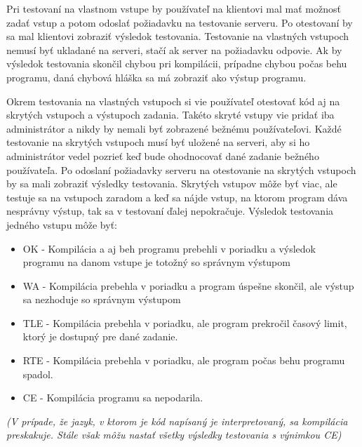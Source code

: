 Pri testovaní na vlastnom vstupe by používateľ na klientovi mal mať možnosť zadať vstup a potom
odoslať požiadavku na testovanie serveru. Po otestovaní by sa mal klientovi zobraziť výsledok
testovania. Testovanie na vlastných vstupoch nemusí byť ukladané na serveri, stačí ak server na
požiadavku odpovie. Ak by výsledok testovania skončil chybou pri kompilácii, prípadne chybou počas
behu programu, daná chybová hláška sa má zobraziť ako výstup programu.

Okrem testovania na vlastných vstupoch si vie používateľ otestovať kód aj na skrytých vstupoch a
výstupoch zadania. Takéto skryté vstupy vie pridať iba administrátor a nikdy by nemali byť zobrazené
bežnému používateľovi. Každé testovanie na skrytých vstupoch musí byť uložené na serveri, aby si ho
administrátor vedel pozrieť keď bude ohodnocovať dané zadanie bežného používateľa. Po odoslaní
požiadavky serveru na otestovanie na skrytých vstupoch by sa mali zobraziť výsledky testovania.
Skrytých vstupov môže byť viac, ale testuje sa na vstupoch zaradom a keď sa nájde vstup, na ktorom
program dáva nesprávny výstup, tak sa v testovaní ďalej nepokračuje.
Výsledok testovania jedného vstupu môže byť:
\begin{itemize}
\item OK - Kompilácia a aj beh programu prebehli v poriadku a výsledok programu na danom vstupe
je totožný so správnym výstupom
\item WA - Kompilácia prebehla v poriadku a program úspešne skončil, ale výstup sa nezhoduje so
správnym výstupom
\item TLE - Kompilácia prebehla v poriadku, ale program prekročil časový limit, ktorý je dostupný 
pre dané zadanie.
\item RTE - Kompilácia prebehla v poriadku, ale program počas behu programu spadol.
\item CE - Kompilácia programu sa nepodarila.
\end{itemize}
\textit{(V prípade, že jazyk, v ktorom je kód napísaný je interpretovaný, sa kompilácia preskakuje.
Stále však môžu nastať všetky výsledky testovania s výnimkou CE)}
